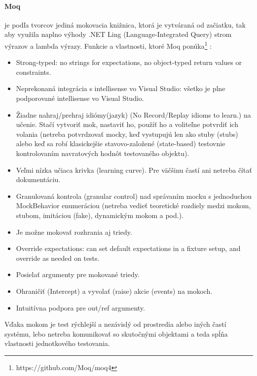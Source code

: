 \documentclass[11pt,twoside,slovak,a4paper]{article}
\begin{document}
			\paragraph{Moq} je podľa tvorcov jediná mokovacia knižnica, ktorá je vytváraná od začiatku, tak aby využila naplno výhody .NET Ling (Language-Integrated Query) strom výrazov a lambda výrazy. 
			Funkcie a vlastnosti, ktoré Moq ponúka\footnote{https://github.com/Moq/moq4} :	
			\begin{itemize}
				\item Strong-typed: no strings for expectations, no object-typed return values or constraints.
				\item Neprekonaná integrácia s intellisense vo Visual Studio: všetko je plne podporované intellisense vo Visual Studio.
				\item Žiadne nahraj/prehraj idiómy(jazyk) (No Record/Replay idioms to learn.) na učenie. Stačí vytvoriť mok, nastaviť ho, použíť ho a voliteľne potvrdiť ich volania (netreba potvrdzovať mocky, keď vystupujú len ako stuby (stubs) alebo keď sa robí klasickejšie stavovo-založené (state-based) testovnie kontrolovaním navratových hodnôt testovaného objektu).
				\item Veľmi nízka učiaca krivka (learning curve). Pre väčšinu častí ani netreba čítať dokumentáciu.
				\item Granulovaná kontrola (granular control) nad správaním mocku s jednoduchou MockBehavior enumeráciou (netreba vedieť teoretické rozdiely medzi mokom, stubom, imitáciou (fake), dynamickým mokom a pod.).
				\item Je možne mokovať rozhrania aj triedy.
				\item Override expectations: can set default expectations in a fixture setup, and override as needed on tests.
				\item Posielať argumenty pre mokované triedy.
				\item Ohraničiť (Intercept) a vyvolať (raise) akcie (events) na mokoch.
				\item Intuitívna podpora pre out/ref argumenty. 
			\end{itemize}
			Vďaka mokom je test rýchlejší a nezávislý od prostredia alebo iných častí systému, lebo netreba komunikovať so skutočnými objektami a teda spĺňa vlastnosti jednotkového testovania.
			
\end{document}
